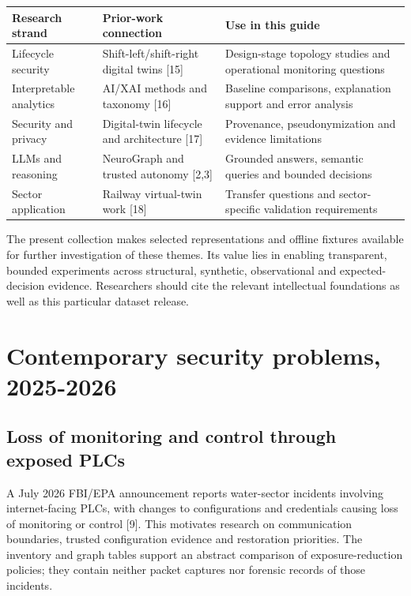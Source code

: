 \begingroup\small\renewcommand{\arraystretch}{1.25}
\begin{tabularx}{\linewidth}{>{\raggedright\arraybackslash}p{28mm}>{\raggedright\arraybackslash}X>{\raggedright\arraybackslash}X}
\toprule
\textbf{Research strand} & \textbf{Prior-work connection} & \textbf{Use in this guide}\\\midrule
Lifecycle security & Shift-left/shift-right digital twins [15] & Design-stage topology studies and operational monitoring questions\\
Interpretable analytics & AI/XAI methods and taxonomy [16] & Baseline comparisons, explanation support and error analysis\\
Security and privacy & Digital-twin lifecycle and architecture [17] & Provenance, pseudonymization and evidence limitations\\
LLMs and reasoning & NeuroGraph and trusted autonomy [2,3] & Grounded answers, semantic queries and bounded decisions\\
Sector application & Railway virtual-twin work [18] & Transfer questions and sector-specific validation requirements\\
\bottomrule\end{tabularx}\endgroup

The present collection makes selected representations and offline fixtures available for further investigation of these themes. Its value lies in enabling transparent, bounded experiments across structural, synthetic, observational and expected-decision evidence. Researchers should cite the relevant intellectual foundations as well as this particular dataset release.



\clearpage\section{Contemporary security problems, 2025-2026}
\subsection*{Loss of monitoring and control through exposed PLCs}
A July 2026 FBI/EPA announcement reports water-sector incidents involving internet-facing PLCs, with changes to configurations and credentials causing loss of monitoring or control [9]. This motivates research on communication boundaries, trusted configuration evidence and restoration priorities. The inventory and graph tables support an abstract comparison of exposure-reduction policies; they contain neither packet captures nor forensic records of those incidents.

